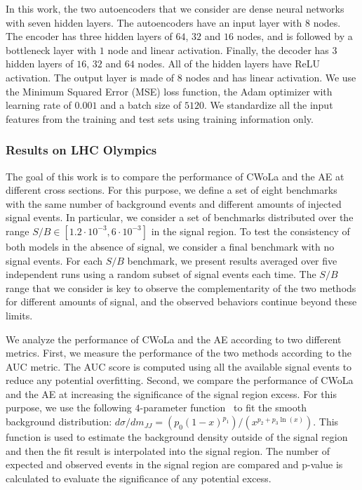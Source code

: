 \documentclass[a4paper,11pt]{article}
\begin{document}
In this work, the two autoencoders that we consider are dense neural networks with seven hidden layers. The autoencoders have an input layer with $8$ nodes. The encoder has three hidden layers of $64$, $32$ and $16$ nodes, and is followed by a bottleneck layer with $1$ node and linear activation. Finally, the decoder has 3 hidden layers of $16$, $32$ and $64$ nodes. All of the hidden layers have ReLU activation. The output layer is made of $8$ nodes and has linear activation. We use the Minimum Squared Error (MSE) loss function, the Adam optimizer with learning rate of $0.001$ and a batch size of $5120$. We standardize all the input features from the training and test sets using training information only.



\subsubsection{Results on LHC Olympics}
\label{sec:results}

The goal of this work is to compare the performance of CWoLa and the AE at different cross sections. For this purpose, we define a set of eight benchmarks with the same number of background events and different amounts of injected signal events. In particular, we consider a set of benchmarks distributed over the range $S/B \in [1.2 \cdot 10^{-3}, 6 \cdot 10^{-3}]$ in the signal region. To test the consistency of both models in the absence of signal, we consider a final benchmark with no signal events. For each $S/B$ benchmark, we present results averaged over five independent runs using a random subset of signal events each time. The $S/B$ range that we consider is key to observe the complementarity of the two methods for different amounts of signal, and the observed behaviors continue beyond these limits.

We analyze the performance of CWoLa and the AE according to two different metrics. First, we measure the performance of the two methods according to the AUC metric. The AUC score is computed using all the available signal events to reduce any potential overfitting. Second, we compare the performance of CWoLa and the AE at increasing the significance of the signal region excess. For this purpose, we use the following $4$-parameter function~\cite{Aad:2019hjw, Sirunyan:2018xlo} to fit the smooth background distribution: $d\sigma / dm_{JJ} = (p_{0}(1-x)^{p_{1}}) / (x^{p_{2}+p_{3}\ln(x)})$. This function is used to estimate the background density outside of the signal region and then the fit result is interpolated into the signal region. The number of expected and observed events in the signal region are compared and p-value is calculated to evaluate the significance of any potential excess.
\end{document}
